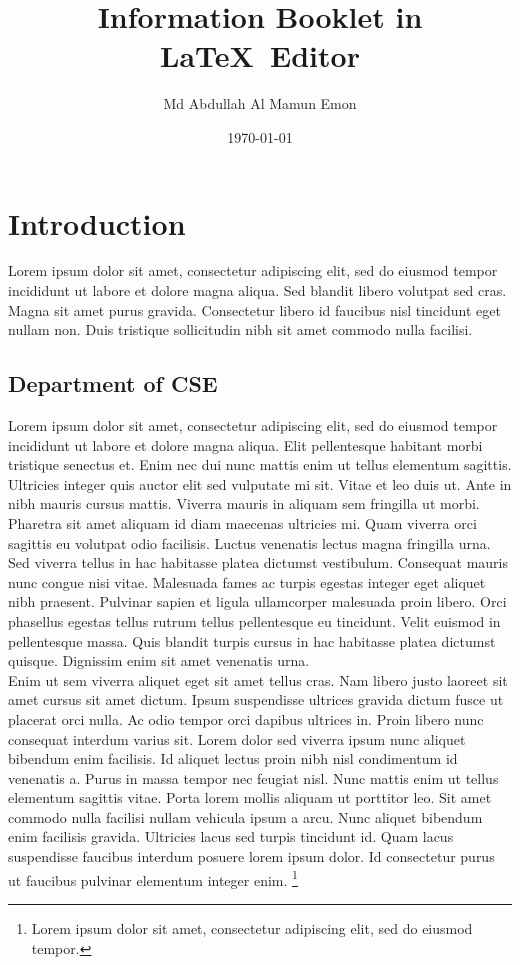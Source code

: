 \documentclass{article}
\title{Information \textbf{Booklet} in \LaTeX\ Editor}
\author{Md Abdullah Al Mamun Emon}
\date{\today}
\begin{document}
\tableofcontents

\maketitle

\section{Introduction}
Lorem ipsum dolor sit amet, consectetur adipiscing elit, sed do eiusmod tempor incididunt ut labore et dolore magna aliqua. Sed blandit libero volutpat sed cras. Magna sit amet purus gravida. Consectetur libero id faucibus nisl tincidunt eget nullam non. Duis tristique sollicitudin nibh sit amet commodo nulla facilisi.
\subsection{Department of CSE}
Lorem ipsum dolor sit amet, consectetur adipiscing elit, sed do eiusmod tempor incididunt ut labore et dolore magna aliqua. Elit pellentesque habitant morbi tristique senectus et. Enim nec dui nunc mattis enim ut tellus elementum sagittis. Ultricies integer quis auctor elit sed vulputate mi sit. Vitae et leo duis ut. Ante in nibh mauris cursus mattis. Viverra mauris in aliquam sem fringilla ut morbi. Pharetra sit amet aliquam id diam maecenas ultricies mi. Quam viverra orci sagittis eu volutpat odio facilisis. Luctus venenatis lectus magna fringilla urna. Sed viverra tellus in hac habitasse platea dictumst vestibulum. Consequat mauris nunc congue nisi vitae. Malesuada fames ac turpis egestas integer eget aliquet nibh praesent. Pulvinar sapien et ligula ullamcorper malesuada proin libero. Orci phasellus egestas tellus rutrum tellus pellentesque eu tincidunt. Velit euismod in pellentesque massa. Quis blandit turpis cursus in hac habitasse platea dictumst quisque. Dignissim enim sit amet venenatis urna.\\

Enim ut sem viverra aliquet eget sit amet tellus cras. Nam libero justo laoreet sit amet cursus sit amet dictum. Ipsum suspendisse ultrices gravida dictum fusce ut placerat orci nulla. Ac odio tempor orci dapibus ultrices in. Proin libero nunc consequat interdum varius sit. Lorem dolor sed viverra ipsum nunc aliquet bibendum enim facilisis. Id aliquet lectus proin nibh nisl condimentum id venenatis a. Purus in massa tempor nec feugiat nisl. Nunc mattis enim ut tellus elementum sagittis vitae. Porta lorem mollis aliquam ut porttitor leo. Sit amet commodo nulla facilisi nullam vehicula ipsum a arcu. Nunc aliquet bibendum enim facilisis gravida. Ultricies lacus sed turpis tincidunt id. Quam lacus suspendisse faucibus interdum posuere lorem ipsum dolor. Id consectetur purus ut faucibus pulvinar elementum integer enim.
\footnote{Lorem ipsum dolor sit amet, consectetur adipiscing elit, sed do eiusmod tempor.}
\end{document}

